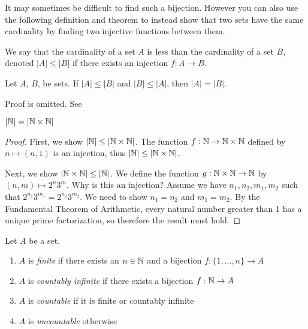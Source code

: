 \documentclass{article}
\begin{document}
It may sometimes be difficult to find such a bijection. However you can also use the following definition and theorem to instead show that two sets have the same cardinality by finding two injective functions between them.

\begin{definition}
We say that the cardinality of a set $A$ is less than the cardinality of a set $B$, denoted $|A| \leq |B|$ if there exists an injection $f:A \to B$.
\end{definition}

\begin{theorem}
Let $A$, $B$, be sets. If $|A| \leq |B|$ and $|B| \leq |A|$, then $|A| = |B|$.
\end{theorem}
Proof is omitted. See \cite[Theorem 1.2.7]{tastetopology}

\begin{example}
\label{ex:nbyn}
$|{\mathbb{N}}| = |{\mathbb{N}} \times {\mathbb{N}}|$
\end{example}
\begin{proof}
First, we show $|{\mathbb{N}}| \leq|{\mathbb{N}} \times {\mathbb{N}}|$. The function $f: {\mathbb{N}} \to {\mathbb{N}} \times {\mathbb{N}}$ defined by $n \mapsto (n,1)$ is an injection, thus $|{\mathbb{N}}| \leq|{\mathbb{N}} \times {\mathbb{N}}|$. 

Next, we show $|{\mathbb{N}} \times {\mathbb{N}}| \leq |{\mathbb{N}}|$. We define the function $g: {\mathbb{N}} \times {\mathbb{N}} \to {\mathbb{N}}$  by $(n,m) \mapsto 2^n 3^m$. Why is this an injection? Assume we have $n_1,n_2,m_1,m_2$ such that $2^{n_1}3^{m_1} = 2^{n_2}3^{m_2}$. We need to show $n_1 = n_2$ and $m_1 = m_2$.  By the Fundamental Theorem of Arithmetic, every natural number greater than 1 has a unique prime factorization, so therefore the result must hold.
\end{proof}


\begin{definition}
Let $A$ be a set. 
\begin{enumerate}
\item $A$ is \emph{finite} if there exists an $n \in {\mathbb{N}}$ and a bijection $f:\{1,\ldots,n\} \to A$
\item $A$ is \emph{countably infinite} if there exists a bijection $f:{\mathbb{N}}\to A$
\item $A$ is \emph{countable} if it is finite or countably infinite
\item $A$ is \emph{uncountable} otherwise
\end{enumerate}
\end{definition}
\end{document}
